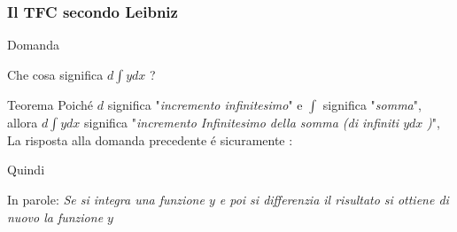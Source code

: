 \begin{frame}
    \frametitle{Il TFC secondo Leibniz}
    \begin{alertblock}{Domanda}
    \begin{center}
        \fontsize{15}{17.2}\selectfont
        Che cosa significa $d$$\int$$ydx$ ?
    \end{center}
    \end{alertblock}
    \begin{block}{Teorema}
        Poiché $d$ significa "\textit{incremento infinitesimo}" e $\int$
        significa "\textit{somma}", allora $d$$\int$$ydx$ significa
        "\textit{incremento Infinitesimo della somma (di infiniti $ydx$} \textit{)}",
        La risposta alla domanda precedente é sicuramente :
        \begin{center}
        \scalebox{2}{%
                    $d$$\int$$ydx = ydx$%
                    }
        \end{center}
        Quindi
        \begin{center}
        \end{center}
        In parole: \textit{Se si integra una funzione $y$ e poi si 
        differenzia il risultato si ottiene di nuovo la funzione $y$
        }
    \end{block}
\end{frame}